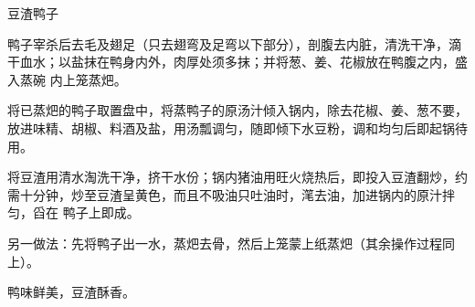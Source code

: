 %
%
%
%
%
%
%
\begin{recipe}{豆渣鸭子}

\ingredients



\preparation

\step 鸭子宰杀后去毛及翅足（只去翅弯及足弯以下部分），剖腹去内脏，清洗干净，滴
干血水；以盐抹在鸭身内外，肉厚处须多抹；并将葱、姜、花椒放在鸭腹之内，盛入蒸碗
内上笼蒸𤆵。

\step 将已蒸𤆵的鸭子取置盘中，将蒸鸭子的原汤汁倾入锅内，除去花椒、姜、葱不要，
放进味精、胡椒、料酒及盐，用汤瓢调匀，随即倾下水豆粉，调和均匀后即起锅待用。

\step 将豆渣用清水淘洗干净，挤干水份；锅内猪油用旺火烧热后，即投入豆渣翻炒，约
需十分钟，炒至豆渣呈黄色，而且不吸油只吐油时，滗去油，加进锅内的原汁拌匀，舀在
鸭子上即成。

另一做法：先将鸭子出一水，蒸𤆵去骨，然后上笼蒙上纸蒸𤆵（其余操作过程同上）。

\features

鸭味鲜美，豆渣酥香。

\end{recipe}

